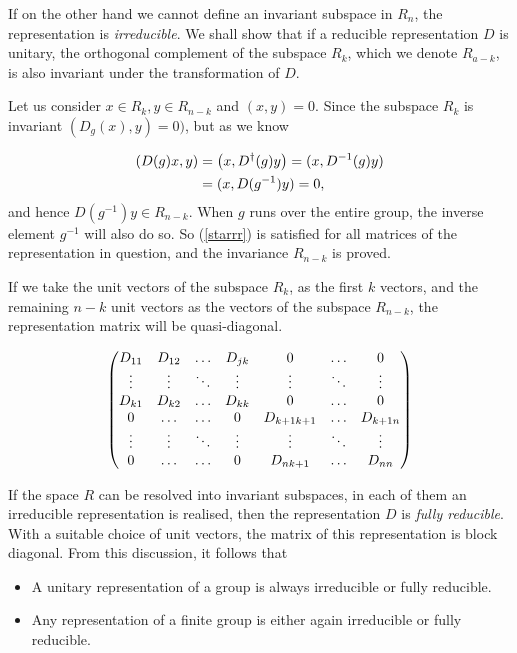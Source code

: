 If on the other hand we cannot define an invariant subspace in $R_n$,
the representation is \emph{irreducible}. We shall show that if a reducible
representation $D$ is unitary, the orthogonal complement of the subspace $R_k$,
which we denote $R_{a-k}$, is also invariant under the transformation of $D$.

Let us consider $x\in R_k,y\in R_{n-k}$ and $(x,y)=0$. Since the subspace $R_k$
is invariant $(D_g(x),y)=0)$, but as we know

\begin{align}
    \qty(D(g)x,y)&=\qty(x,D^\dagger(g)y)=(x,D^{-1}(g)y)\\
                 &=(x,D(g^{-1})y)=0\label{starrr},
\end{align}
and hence $D(g^{-1})y\in R_{n-k}$. When $g$ runs over the entire group,
the inverse element $g^{-1}$ will also do so. So (\autoref{starrr}) is satisfied
for all matrices of the representation in question, and the invariance $R_{n-k}$
is proved.

If we take the unit vectors of the subspace $R_k$, as the first $k$ vectors, and
the remaining $n-k$ unit vectors as the vectors of the subspace $R_{n-k}$, the
representation matrix will be quasi-diagonal.

\begin{align}
    \mqty(D_{11} & D_{12} & \dots & D_{jk} & 0 & \dots & 0\\
    \vdots & \vdots & \ddots & \vdots & \vdots & \ddots & \vdots \\
    D_{k1} & D_{k2} & \dots & D_{kk} & 0 & \dots & 0\\
    0 & \dots & \dots & 0 & D_{k+1 k+1} & \dots & D_{k+1n}\\
    \vdots & \vdots & \ddots & \vdots & \vdots & \ddots & \vdots\\
    0 & \dots & \dots & 0 & D_{nk+1} & \dots &D_{nn}
    )
\end{align}

If the space $R$ can be resolved into invariant subspaces, in each of them an
irreducible representation is realised, then the representation $D$ is
\emph{fully reducible}. With a suitable choice of unit vectors, the matrix of
this representation is block diagonal. From this discussion, it follows that

\begin{itemize}
    \item A unitary representation of a group is always irreducible or fully
        reducible.
    \item Any representation of a finite group is either again irreducible or
        fully reducible.
\end{itemize}


